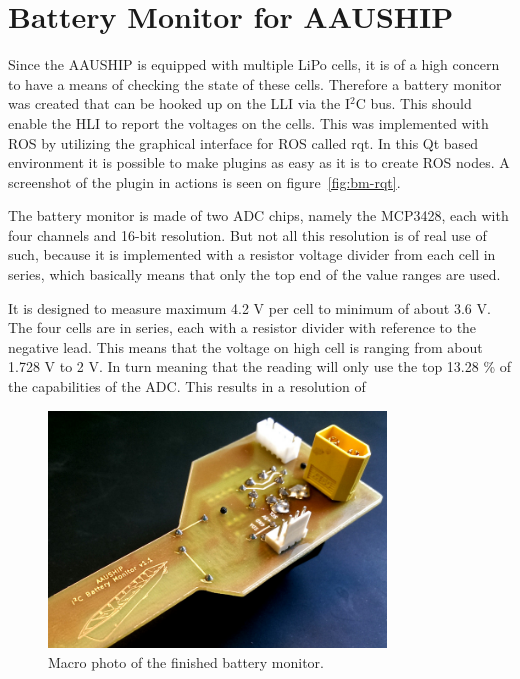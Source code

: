 \chapter{Battery Monitor for AAUSHIP}
\label{ch:bm}


Since the AAUSHIP is equipped with multiple LiPo cells, it is of
a high concern to have a means of checking the state of these cells.
Therefore a battery monitor was created that can be hooked up on the
\ac{LLI} via the I$^2$C bus. This should enable the \ac{HLI} to report
the voltages on the cells. This was implemented with \ac{ROS} by
utilizing the graphical interface for \ac{ROS} called rqt. In this Qt
based environment it is possible to make plugins as easy as it is to
create \ac{ROS} nodes. A screenshot of the plugin in actions is seen
on figure~\vref{fig:bm-rqt}.

The battery monitor is made of two \ac{ADC} chips, namely the MCP3428,
each with four channels and 16-bit resolution. But not all this
resolution is of real use of such, because it is implemented with a
resistor voltage divider from each cell in series, which basically
means that only the top end of the value ranges are used. 

It is designed to measure maximum 4.2 V per cell to minimum of about
3.6 V. The four cells are in series, each with a resistor divider with
reference to the negative lead. This means that the voltage on high
cell is ranging from about 1.728 V to 2 V. In turn meaning that the
reading will only use the top  13.28 \% of the capabilities of the 
\ac{ADC}. This results in a resolution of 

\begin{figure}[H]
	\centering
	\includegraphics[width=0.8\textwidth]{fig/bm-macro}
	\caption{Macro photo of the finished battery monitor.}
	\label{fig:bm-macro}
\end{figure}

